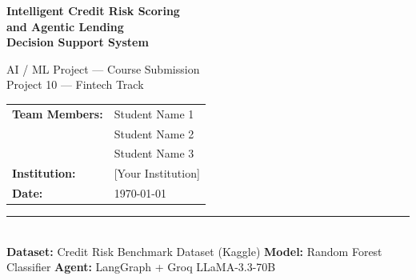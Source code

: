 \documentclass[11pt,a4paper]{article}
\begin{document}

\begin{titlepage}
\centering
\vspace*{2cm}

{\Huge\bfseries\color{navy}
Intelligent Credit Risk Scoring\\[0.4em]
and Agentic Lending\\[0.4em]
Decision Support System
\par}

\vspace{1.5cm}
{\large AI / ML Project — Course Submission}\\[0.5em]
{\large\color{gray} Project 10 — Fintech Track}

\vspace{2cm}
\begin{tabular}{ll}
\textbf{Team Members:} & Student Name 1 \\
                       & Student Name 2 \\
                       & Student Name 3 \\[0.5em]
\textbf{Institution:}  & [Your Institution] \\[0.5em]
\textbf{Date:}         & \today
\end{tabular}

\vfill
\rule{\linewidth}{0.5pt}\\[6pt]
{\small
\textbf{Dataset:} Credit Risk Benchmark Dataset (Kaggle) \quad
\textbf{Model:} Random Forest Classifier \quad
\textbf{Agent:} LangGraph + Groq LLaMA-3.3-70B}
\end{titlepage}

\begin{abstract}
This paper presents an end-to-end AI-powered credit risk assessment system designed to
assist lending institutions in evaluating borrower financial risk. The system employs a
two-milestone architecture. In the first milestone, a \textbf{Random Forest classifier}
trained on approximately 150,000 historical borrower records predicts the probability that
a borrower will become seriously delinquent within two years. Class imbalance is addressed
through \texttt{class\_weight=\textquotesingle balanced\textquotesingle}. Per-prediction explainability
is provided via SHAP (SHapley Additive exPlanations) values, ensuring compliance with
regulatory adverse-action notice requirements. The model achieves a cross-validated
ROC-AUC of approximately 0.86. In the second milestone, a \textbf{LangGraph agentic
workflow} extends the system with a Retrieval-Augmented Generation (RAG) pipeline backed
by a FAISS vector index of curated lending policy documents, and an open-source LLM
(LLaMA-3.3-70B via Groq) that synthesises the risk signal and policy context into a
structured lending assessment memo. The complete application is deployed as a premium
Streamlit dashboard with interactive SHAP visualisations, batch scoring, portfolio
analytics, and one-click PDF report generation.
\end{abstract}
\end{document}

